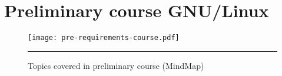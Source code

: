 \chapter{Preliminary course GNU/Linux}
\label{Preliminary course - dpkg based GNU/Linux}
\begin{figure}[H] 
 \centering 
 \texttt{[image: pre-requirements-course.pdf]}
 \rule{25em}{0.5pt}  
 \caption{Topics covered in preliminary course (MindMap)} 
 \label{Topics covered in preliminary course} 
\end{figure}